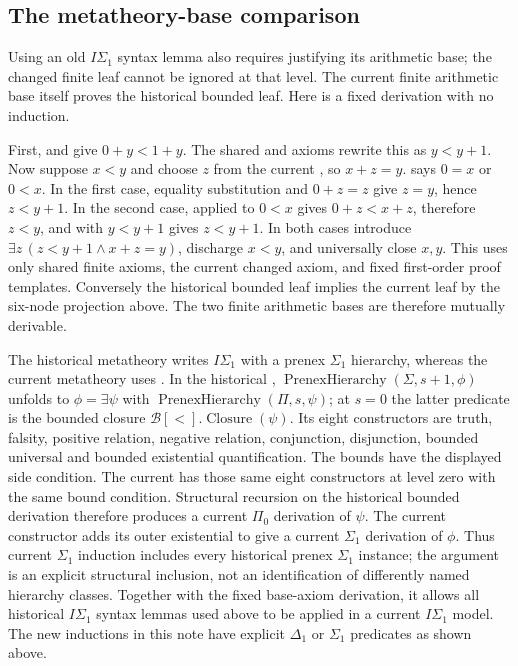 \subsection{The metatheory-base comparison}

Using an old $I\Sigma_1$ syntax lemma also requires justifying its
arithmetic base; the changed finite leaf cannot be ignored at that level.
The current finite arithmetic base itself proves the historical bounded
leaf.  Here is a fixed derivation with no induction.

First,  and  give
$0+y<1+y$.  The shared  and 
axioms rewrite this as $y<y+1$.
Now suppose $x<y$ and choose $z$ from the current
, so $x+z=y$.
 says $0=x$ or $0<x$.
In the first case, equality substitution and $0+z=z$ give $z=y$,
hence $z<y+1$.  In the second case,
 applied to $0<x$ gives $0+z<x+z$,
therefore $z<y$, and  with $y<y+1$ gives
$z<y+1$.  In both cases introduce
$\exists z\,(z<y+1\land x+z=y)$, discharge $x<y$, and
universally close $x,y$.
This uses only shared finite axioms, the current changed axiom, and
fixed first-order proof templates.  Conversely the historical bounded
leaf implies the current leaf by the six-node projection above.
The two finite arithmetic bases are therefore mutually derivable.

The historical metatheory writes $I\Sigma_1$ with a prenex
$\Sigma_1$ hierarchy, whereas the current metatheory uses
.  In the historical
,
$\operatorname{PrenexHierarchy}(\Sigma,s+1,\phi)$ unfolds to
$\phi=\exists\psi$ with
$\operatorname{PrenexHierarchy}(\Pi,s,\psi)$;
at $s=0$ the latter predicate is the bounded closure
$\mathcal B[<].\operatorname{Closure}(\psi)$.
Its eight constructors are truth, falsity, positive relation, negative
relation, conjunction, disjunction, bounded universal and bounded
existential quantification.  The bounds have the displayed
 side condition.
The current  has those same
eight constructors at level zero with the same bound condition.
Structural recursion on the historical bounded derivation therefore
produces a current $\Pi_0$ derivation of $\psi$.  The current
 constructor adds its outer existential to
give a current $\Sigma_1$ derivation of $\phi$.
Thus current $\Sigma_1$ induction includes every historical prenex
$\Sigma_1$ instance; the argument is an explicit structural inclusion,
not an identification of differently named hierarchy classes.
Together with the fixed base-axiom derivation, it allows all historical
$I\Sigma_1$ syntax lemmas used above to be applied in a current
$I\Sigma_1$ model.  The new inductions in this note have explicit
$\Delta_1$ or $\Sigma_1$ predicates as shown above.


